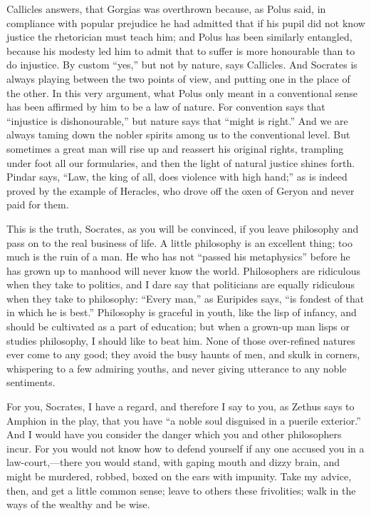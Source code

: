 \documentclass[11pt,letter]{article}
\begin{document}
\par  Callicles answers, that Gorgias was overthrown because, as Polus said, in compliance with popular prejudice he had admitted that if his pupil did not know justice the rhetorician must teach him; and Polus has been similarly entangled, because his modesty led him to admit that to suffer is more honourable than to do injustice. By custom “yes,” but not by nature, says Callicles. And Socrates is always playing between the two points of view, and putting one in the place of the other. In this very argument, what Polus only meant in a conventional sense has been affirmed by him to be a law of nature. For convention says that “injustice is dishonourable,” but nature says that “might is right.” And we are always taming down the nobler spirits among us to the conventional level. But sometimes a great man will rise up and reassert his original rights, trampling under foot all our formularies, and then the light of natural justice shines forth. Pindar says, “Law, the king of all, does violence with high hand;” as is indeed proved by the example of Heracles, who drove off the oxen of Geryon and never paid for them.

\par  This is the truth, Socrates, as you will be convinced, if you leave philosophy and pass on to the real business of life. A little philosophy is an excellent thing; too much is the ruin of a man. He who has not “passed his metaphysics” before he has grown up to manhood will never know the world. Philosophers are ridiculous when they take to politics, and I dare say that politicians are equally ridiculous when they take to philosophy: “Every man,” as Euripides says, “is fondest of that in which he is best.” Philosophy is graceful in youth, like the lisp of infancy, and should be cultivated as a part of education; but when a grown-up man lisps or studies philosophy, I should like to beat him. None of those over-refined natures ever come to any good; they avoid the busy haunts of men, and skulk in corners, whispering to a few admiring youths, and never giving utterance to any noble sentiments.

\par  For you, Socrates, I have a regard, and therefore I say to you, as Zethus says to Amphion in the play, that you have “a noble soul disguised in a puerile exterior.” And I would have you consider the danger which you and other philosophers incur. For you would not know how to defend yourself if any one accused you in a law-court,—there you would stand, with gaping mouth and dizzy brain, and might be murdered, robbed, boxed on the ears with impunity. Take my advice, then, and get a little common sense; leave to others these frivolities; walk in the ways of the wealthy and be wise.
\end{document}
